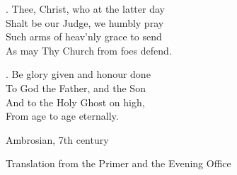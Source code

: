 {{. Thee, Christ, who at the latter day\\
Shalt be our Judge, we humbly pray\\
Such arms of heav'nly grace to send\\
As may Thy Church from foes defend.

. Be glory given and honour done\\
To God the Father, and the Son\\
And to the Holy Ghost on high,\\
From age to age eternally.

}

}


\endlyrics

\medskip

\source Ambrosian, 7th century

\source Translation from the Primer {} and the Evening Office 

